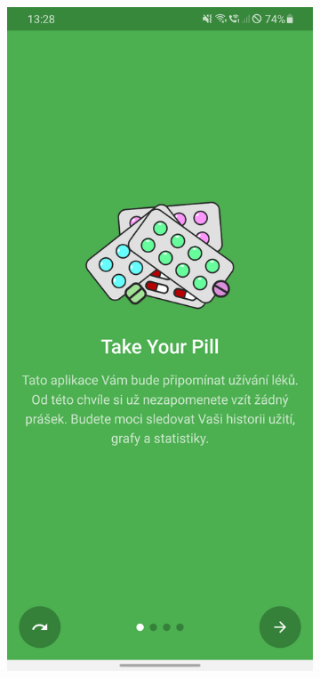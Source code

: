 \documentclass[../TakeYourPill.tex]{subfiles}
\begin{document}
\newpage

\begin{figure}[h]
  \vfill
  \hfill
  \begin{subfigure}[b]{.3\textwidth}
    \centering
    \includegraphics[width=\textwidth]{app-intro-screenshot}

\end{subfigure}
\end{figure}
\end{document}
